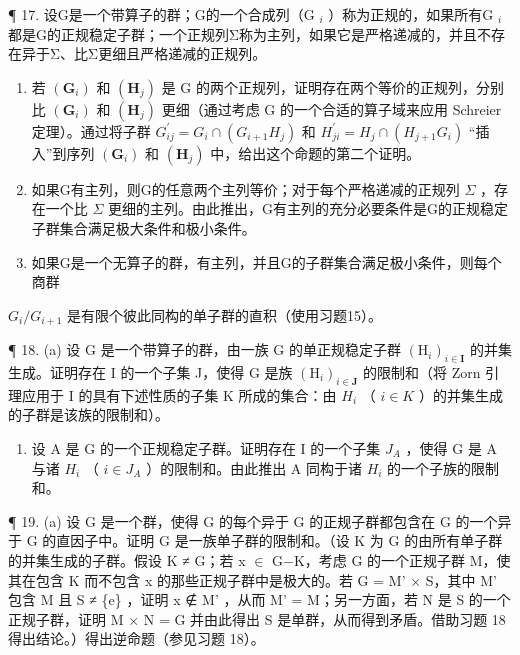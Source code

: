 ¶ 17. 设G是一个带算子的群；G的一个合成列（G \(_{i}\) ）称为正规的，如果所有G \(_{i}\) 都是G的正规稳定子群；一个正规列Σ称为主列，如果它是严格递减的，并且不存在异于Σ、比Σ更细且严格递减的正规列。

\begin{enumerate}
\def\labelenumi{(\alph{enumi})}
\item
  若 \((\mathbf{G}_{i})\) 和 \((\mathbf{H}_{j})\) 是 G 的两个正规列，证明存在两个等价的正规列，分别比 \((\mathbf{G}_{i})\) 和 \((\mathbf{H}_{j})\) 更细（通过考虑 G 的一个合适的算子域来应用 Schreier 定理）。通过将子群 \(G_{ij}^{\prime} = G_{i} \cap (G_{i+1}H_{j})\) 和 \(H_{ji}^{\prime} = H_{j} \cap (H_{j+1}G_{i})\) “插入”到序列 \((\mathbf{G}_{i})\) 和 \((\mathbf{H}_{j})\) 中，给出这个命题的第二个证明。
\item
  如果G有主列，则G的任意两个主列等价；对于每个严格递减的正规列 \(\Sigma\) ，存在一个比 \(\Sigma\) 更细的主列。由此推出，G有主列的充分必要条件是G的正规稳定子群集合满足极大条件和极小条件。
\item
  如果G是一个无算子的群，有主列，并且G的子群集合满足极小条件，则每个商群
\end{enumerate}

\(G_{i}/G_{i+1}\) 是有限个彼此同构的单子群的直积（使用习题15）。

¶ 18. (a) 设 G 是一个带算子的群，由一族 G 的单正规稳定子群 \((\mathrm{H}_{i})_{i\in\mathbf{I}}\) 的并集生成。证明存在 I 的一个子集 J，使得 G 是族 \((\mathrm{H}_{i})_{i\in\mathbf{J}}\) 的限制和（将 Zorn 引理应用于 I 的具有下述性质的子集 K 所成的集合：由 \(H_{i}\) （ \(i\in K\) ）的并集生成的子群是该族的限制和）。

\begin{enumerate}
\def\labelenumi{(\alph{enumi})}
\setcounter{enumi}{1}
\tightlist
\item
  设 A 是 G 的一个正规稳定子群。证明存在 I 的一个子集 \(J_{A}\) ，使得 G 是 A 与诸 \(H_{i}\) （ \(i \in J_{A}\) ）的限制和。由此推出 A 同构于诸 \(H_{i}\) 的一个子族的限制和。
\end{enumerate}

¶ 19. (a) 设 G 是一个群，使得 G 的每个异于 G 的正规子群都包含在 G 的一个异于 G 的直因子中。证明 G 是一族单子群的限制和。（设 K 为 G 的由所有单子群的并集生成的子群。假设 K ≠ G；若 x \ensuremath{\in} G−K，考虑 G 的一个正规子群 M，使其在包含 K 而不包含 x 的那些正规子群中是极大的。若 G = M' × S，其中 M' 包含 M 且 S ≠ \{e\} ，证明 x ∉ M' ，从而 M' = M；另一方面，若 N 是 S 的一个正规子群，证明 M × N = G 并由此得出 S 是单群，从而得到矛盾。借助习题 18 得出结论。）得出逆命题（参见习题 18）。

